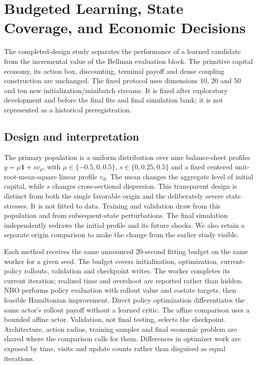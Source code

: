 \section{Budgeted Learning, State Coverage, and Economic Decisions}\label{sec:r13study}
The completed-design study separates the performance of a learned candidate from the incremental value of the Bellman evaluation block. The primitive capital economy, its action box, discounting, terminal payoff and dense coupling construction are unchanged. The fixed protocol uses dimensions 10, 20 and 50 and ten new initialization/minibatch streams. It is fixed after exploratory development and before the final fits and final simulation bank; it is not represented as a historical preregistration.

\subsection{Design and interpretation}
The primary population is a uniform distribution over nine balance-sheet profiles $y=\mu\bm1+sv_d$, with $\mu\in\{-0.5,0,0.5\}$, $s\in\{0,0.25,0.5\}$ and a fixed centered unit-root-mean-square linear profile $v_d$. The mean changes the aggregate level of initial capital, while $s$ changes cross-sectional dispersion. This transparent design is distinct from both the single favorable origin and the deliberately severe state stresses. It is not fitted to data. Training and validation draw from this population and from subsequent-state perturbations. The final simulation independently redraws the initial profile and its future shocks. We also retain a separate origin comparison to make the change from the earlier study visible.

Each method receives the same announced 20-second fitting budget on the same worker for a given seed. The budget covers initialization, optimization, current-policy rollouts, validation and checkpoint writes. The worker completes its current iteration; realized time and overshoot are reported rather than hidden. NBO performs policy evaluation with rollout value and costate targets, then feasible Hamiltonian improvement. Direct policy optimization differentiates the same actor's rollout payoff without a learned critic. The affine comparison uses a bounded affine actor. Validation, not final testing, selects the checkpoint. Architecture, action radius, training sampler and final economic problem are shared where the comparison calls for them. Differences in optimizer work are exposed by time, visits and update counts rather than disguised as equal iterations.

